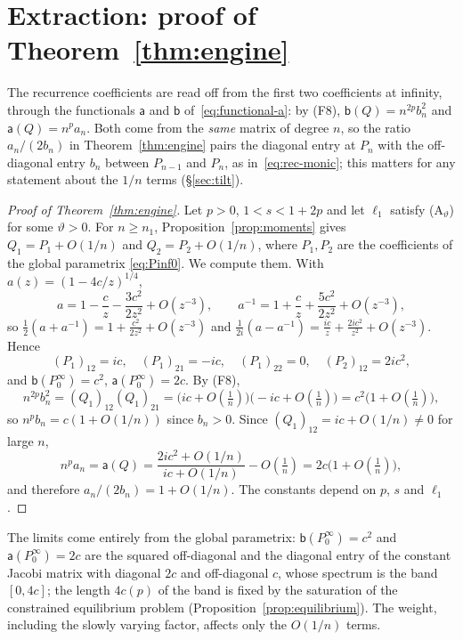 \providecommand{\Pinfz}{P^\infty_0}
\providecommand{\Fi}[1]{\textup{(F#1)}}
\providecommand{\Ath}[1]{\textup{(A$_{#1}$)}}

\section{\texorpdfstring{Extraction: proof of Theorem~\ref{thm:engine}}{Extraction: proof of the Riemann-Hilbert theorem}}\label{sec:extraction}

The recurrence coefficients are read off from the first two coefficients at infinity, through the functionals
$\mathsf a$ and $\mathsf b$ of~\eqref{eq:functional-a}: by \Fi8, $\mathsf b(Q)=n^{2p}b_n^2$ and $\mathsf a(Q)=n^pa_n$. Both
come from the \emph{same} matrix of degree $n$, so the ratio $a_n/(2b_n)$ in Theorem~\ref{thm:engine} pairs the diagonal
entry at $P_n$ with the off-diagonal entry $b_n$ between $P_{n-1}$ and $P_n$, as in~\eqref{eq:rec-monic}; this matters for
any statement about the $1/n$ terms (\S\ref{sec:tilt}).

\begin{proof}[Proof of Theorem~\ref{thm:engine}]
Let $p>0$, $1<s<1+2p$ and let $\ell_1$ satisfy \Ath{\vartheta} for some $\vartheta>0$. For $n\ge n_1$, Proposition~\ref{prop:moments}
gives $Q_1=P_1+O(1/n)$ and $Q_2=P_2+O(1/n)$, where $P_1,P_2$ are the coefficients of the global parametrix
\eqref{eq:Pinf0}. We compute them. With $a(z)=(1-4c/z)^{1/4}$,
\[
  a=1-\frac cz-\frac{3c^2}{2z^2}+O(z^{-3}),\qquad a^{-1}=1+\frac cz+\frac{5c^2}{2z^2}+O(z^{-3}),
\]
so $\frac12(a+a^{-1})=1+\frac{c^2}{2z^2}+O(z^{-3})$ and $\frac1{2i}(a-a^{-1})=\frac{ic}z+\frac{2ic^2}{z^2}+O(z^{-3})$. Hence
\[
  (P_1)_{12}=ic,\quad (P_1)_{21}=-ic,\quad (P_1)_{22}=0,\quad (P_2)_{12}=2ic^2,
\]
and $\mathsf b(\Pinfz)=c^2$, $\mathsf a(\Pinfz)=2c$. By \Fi8,
\[
  n^{2p}b_n^2=(Q_1)_{12}(Q_1)_{21}=\bigl(ic+O(\tfrac1n)\bigr)\bigl(-ic+O(\tfrac1n)\bigr)=c^2\bigl(1+O(\tfrac1n)\bigr),
\]
so $n^pb_n=c(1+O(1/n))$ since $b_n>0$. Since $(Q_1)_{12}=ic+O(1/n)\ne0$ for large $n$,
\[
  n^pa_n=\mathsf a(Q)=\frac{2ic^2+O(1/n)}{ic+O(1/n)}-O(\tfrac1n)=2c\bigl(1+O(\tfrac1n)\bigr),
\]
and therefore $a_n/(2b_n)=1+O(1/n)$. The constants depend on $p$, $s$ and $\ell_1$.
\end{proof}

The limits come entirely from the global parametrix: $\mathsf b(\Pinfz)=c^2$ and $\mathsf a(\Pinfz)=2c$ are the squared
off-diagonal and the diagonal entry of the constant Jacobi matrix with diagonal $2c$ and off-diagonal $c$, whose spectrum
is the band $[0,4c]$; the length
$4c(p)$ of the band is fixed by the saturation of the constrained equilibrium problem
(Proposition~\ref{prop:equilibrium}). The weight, including the slowly varying factor, affects only the $O(1/n)$ terms.

